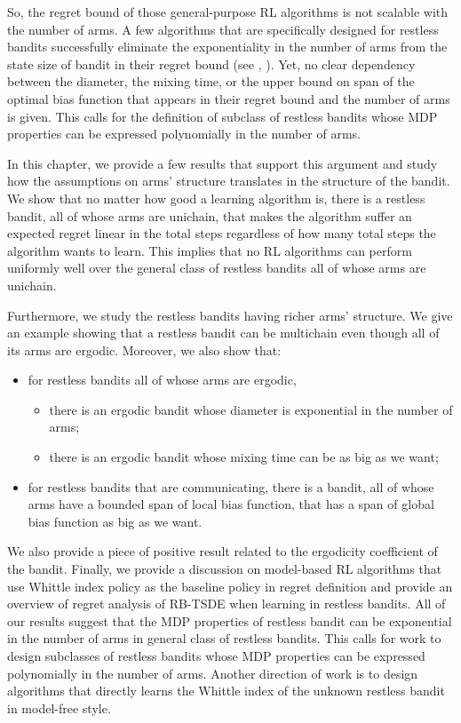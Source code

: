 So, the regret bound of those general-purpose RL algorithms is not scalable with the number of arms.
A few algorithms that are specifically designed for restless bandits successfully eliminate the exponentiality in the number of arms from the state size of bandit in their regret bound (see \eg, \cite{ortner2012regret, jung2019thompson, akbarzadeh2022learning}).
Yet, no clear dependency between the diameter, the mixing time, or the upper bound on span of the optimal bias function that appears in their regret bound and the number of arms is given.
This calls for the definition of subclass of restless bandits whose MDP properties can be expressed polynomially in the number of arms.

In this chapter, we provide a few results that support this argument and study how the assumptions on arms' structure translates in the structure of the bandit.
We show that no matter how good a learning algorithm is, there is a restless bandit, all of whose arms are unichain, that makes the algorithm suffer an expected regret linear in the total steps regardless of how many total steps the algorithm wants to learn.
This implies that no RL algorithms can perform uniformly well over the general class of restless bandits all of whose arms are unichain. 

Furthermore, we study the restless bandits having richer arms' structure.
We give an example showing that a restless bandit can be multichain even though all of its arms are ergodic.
Moreover, we also show that:
\begin{itemize}
    \item for restless bandits all of whose arms are ergodic,
        \begin{itemize}
            \item there is an ergodic bandit whose diameter is exponential in the number of arms;
            \item there is an ergodic bandit whose mixing time can be as big as we want;
        \end{itemize}
    \item for restless bandits that are communicating, there is a bandit, all of whose arms have a bounded span of local bias function, that has a span of global bias function as big as we want.
\end{itemize}
We also provide a piece of positive result related to the ergodicity coefficient of the bandit.
Finally, we provide a discussion on model-based RL algorithms that use Whittle index policy as the baseline policy in regret definition and provide an overview of regret analysis of RB-TSDE \cite{akbarzadeh2022learning} when learning in restless bandits.
All of our results suggest that the MDP properties of restless bandit can be exponential in the number of arms in general class of restless bandits.
This calls for work to design subclasses of restless bandits whose MDP properties can be expressed polynomially in the number of arms.
Another direction of work is to design algorithms that directly learns the Whittle index of the unknown restless bandit in model-free style.

